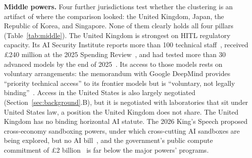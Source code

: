 \documentclass{ieeeaccess}
\begin{document}
\textbf{Middle powers.} Four further jurisdictions test whether the clustering is an artifact of where the comparison looked: the United Kingdom, Japan, the Republic of Korea, and Singapore. None of them clearly holds all four pillars (Table~\ref{tab:middle}). The United Kingdom is strongest on HITL regulatory capacity. Its AI Security Institute reports more than 100 technical staff~\cite{ukaisi2026}, received \pounds240 million at the 2025 Spending Review~\cite{ukaiopp2026oneyear}, and had tested more than 30 advanced models by the end of 2025~\cite{ukaisi2025review}. Its access to those models rests on voluntary arrangements: the memorandum with Google DeepMind provides ``priority technical access'' to its frontier models but is ``voluntary, not legally binding''~\cite{ukgdmmou2025}. Access in the United States is also largely negotiated (Section~\ref{sec:background}.B), but it is negotiated with laboratories that sit under United States law, a position the United Kingdom does not share. The United Kingdom has no binding horizontal AI statute. The 2026 King's Speech proposed cross-economy sandboxing powers, under which cross-cutting AI sandboxes are being explored, but no AI bill~\cite{ukkingsspeech2026,lewissilkin2026ukaibill}, and the government's public compute commitment of \pounds2 billion~\cite{ukaiopp2026oneyear} is far below the major powers' programs.
\end{document}
